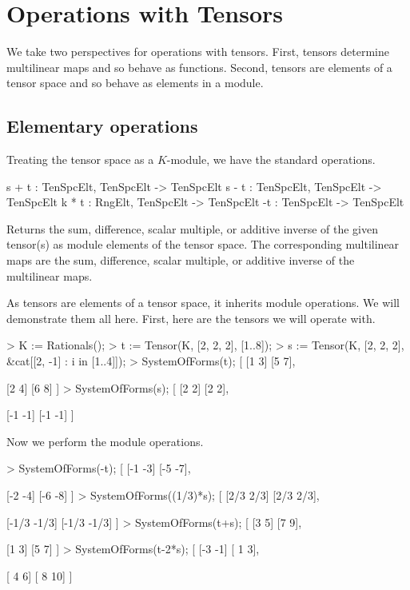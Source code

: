 \section{Operations with Tensors}

We take two perspectives for operations with tensors. 
First, tensors determine multilinear maps and so behave as
functions.  Second, tensors are elements of a tensor space and 
so behave as elements in a module.  

\subsection{Elementary operations}
Treating the tensor space as a $K$-module, we have the standard operations.

\index{$+$}
\begin{intrinsics}
s + t : TenSpcElt, TenSpcElt -> TenSpcElt
s - t : TenSpcElt, TenSpcElt -> TenSpcElt
k * t : RngElt, TenSpcElt -> TenSpcElt
-t : TenSpcElt -> TenSpcElt
\end{intrinsics}

Returns the sum, difference, scalar multiple, or additive inverse of the given tensor(s) as module elements of the tensor space. 
The corresponding multilinear maps are the sum, difference, scalar multiple, or additive inverse of the multilinear maps.

\begin{example}[ModuleOperations]

As tensors are elements of a tensor space, it inherits module operations. 
We will demonstrate them all here.
First, here are the tensors we will operate with.
\begin{code}
> K := Rationals();
> t := Tensor(K, [2, 2, 2], [1..8]);
> s := Tensor(K, [2, 2, 2], &cat[[2, -1] : i in [1..4]]);
> SystemOfForms(t);
[
    [1 3]
    [5 7],

    [2 4]
    [6 8]
]
> SystemOfForms(s);
[
    [2 2]
    [2 2],

    [-1 -1]
    [-1 -1]
]
\end{code}

Now we perform the module operations.
\begin{code}
> SystemOfForms(-t);
[
    [-1 -3]
    [-5 -7],

    [-2 -4]
    [-6 -8]
]
> SystemOfForms((1/3)*s);
[
    [2/3 2/3]
    [2/3 2/3],

    [-1/3 -1/3]
    [-1/3 -1/3]
]
> SystemOfForms(t+s);
[
    [3 5]
    [7 9],

    [1 3]
    [5 7]
]
> SystemOfForms(t-2*s);
[
    [-3 -1]
    [ 1  3],

    [ 4  6]
    [ 8 10]
]
\end{code}
\end{example}

